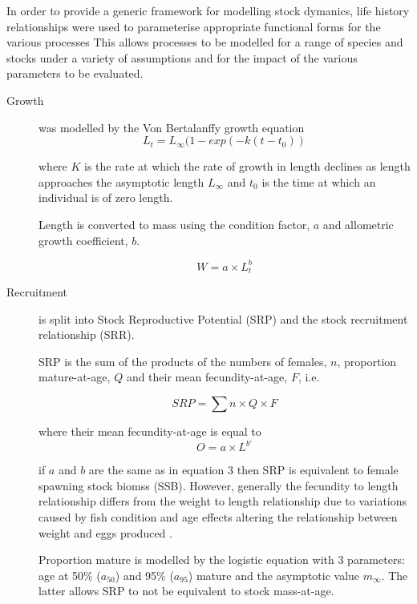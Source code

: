 \documentclass{pnastwo}
\begin{document}
\begin{article}
In order to provide a generic framework for modelling stock dymanics, life history relationships were used to parameterise appropriate functional forms for 
the various processes  This allows processes to be modelled for a range of species and stocks under a variety of assumptions and for the impact of the various parameters
to be evaluated.  


\begin{description}
    \item[Growth] was modelled by the Von Bertalanffy growth equation \cite{von1957quantitative}
      \begin{equation} L_t = L_{\infty}(1 - exp(-k(t-t_0)) \end{equation}
         
where $K$ is the rate at which the rate of growth in length declines as length approaches the asymptotic length  $L_{\infty}$ 
and $t_{0}$ is the time at which an individual is of zero length. 

Length is converted to mass using the condition factor, $a$ and allometric growth coefficient, $b$.

\begin{equation} W = a \times L_t^b \end{equation}

 \item[Recruitment] is split into Stock Reproductive Potential (SRP) and the stock recruitment relationship (SRR).

SRP is the sum of the products of the numbers of females, $n$, proportion mature-at-age, $Q$ and their mean fecundity-at-age, $F$, i.e. 

   \begin{equation} SRP = \sum{n \times Q \times F } \end{equation}

where their mean fecundity-at-age is equal to 
\begin{equation} O	 = a \times L^{b\prime} \end{equation}

if $a$ and $b$ are the same as in equation 3 then SRP is equivalent to female spawning stock biomss (SSB). However, generally the 
fecundity to length relationship differs from the weight to length relationship due to variations caused by fish condition and age 
effects altering the relationship between weight and eggs produced \cite{perez2012study}.

Proportion mature is modelled by the logistic equation with 3 parameters: age at 50\% ($a_{50}$) and 95\% ($a_{95}$) mature and the asymptotic value $m_{\infty}$. The 
latter allows SRP to not be equivalent to stock mass-at-age.


\end{description}
\end{article}
\end{document}
